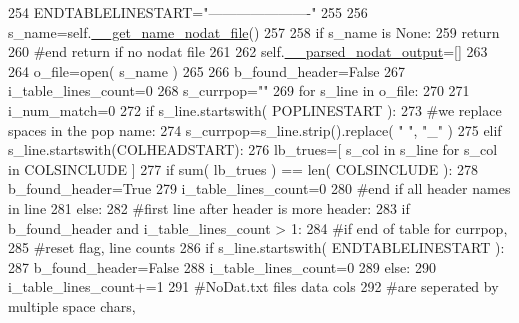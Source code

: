 \begin{DoxyCode}
254         ENDTABLELINESTART=\textcolor{stringliteral}{"----------------------"}  
255 
256         s\_name=self.\hyperlink{classnegui_1_1pgoutputneestimator_1_1PGOutputNeEstimator_ab1fea13d322982ecc8b5fbe42741de50}{\_\_get\_name\_nodat\_file}()
257 
258         \textcolor{keywordflow}{if} s\_name \textcolor{keywordflow}{is} \textcolor{keywordtype}{None}:
259             \textcolor{keywordflow}{return}
260         \textcolor{comment}{#end return if no nodat file}
261 
262         self.\hyperlink{classnegui_1_1pgoutputneestimator_1_1PGOutputNeEstimator_acd31d6f910fc03d1945e38b6c4fa79c0}{\_\_parsed\_nodat\_output}=[]
263 
264         o\_file=open( s\_name )
265 
266         b\_found\_header=\textcolor{keyword}{False}
267         i\_table\_lines\_count=0
268         s\_currpop=\textcolor{stringliteral}{""}
269         \textcolor{keywordflow}{for} s\_line \textcolor{keywordflow}{in} o\_file:
270 
271             i\_num\_match=0
272             \textcolor{keywordflow}{if} s\_line.startswith( POPLINESTART ):
273                 \textcolor{comment}{#we replace spaces in the pop name:}
274                 s\_currpop=s\_line.strip().replace( \textcolor{stringliteral}{" "}, \textcolor{stringliteral}{"\_"} )
275             \textcolor{keywordflow}{elif} s\_line.startswith(COLHEADSTART):
276                 lb\_trues=[ s\_col \textcolor{keywordflow}{in} s\_line \textcolor{keywordflow}{for} s\_col \textcolor{keywordflow}{in} COLSINCLUDE ]
277                 \textcolor{keywordflow}{if} sum( lb\_trues ) == len( COLSINCLUDE ):
278                     b\_found\_header=\textcolor{keyword}{True}
279                     i\_table\_lines\_count=0
280                 \textcolor{comment}{#end if all header names in line}
281             \textcolor{keywordflow}{else}:
282                 \textcolor{comment}{#first line after header is more header:}
283                 \textcolor{keywordflow}{if} b\_found\_header \textcolor{keywordflow}{and} i\_table\_lines\_count > 1:
284                     \textcolor{comment}{#if end of table for currpop, }
285                     \textcolor{comment}{#reset flag, line counts}
286                     \textcolor{keywordflow}{if} s\_line.startswith( ENDTABLELINESTART ):
287                         b\_found\_header=\textcolor{keyword}{False}
288                         i\_table\_lines\_count=0
289                     \textcolor{keywordflow}{else}:
290                         i\_table\_lines\_count+=1
291                         \textcolor{comment}{#NoDat.txt files data cols}
292                         \textcolor{comment}{#are seperated by multiple space chars,}

\end{DoxyCode}

